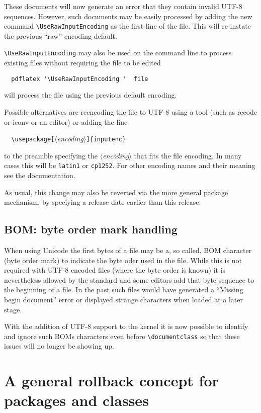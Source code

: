 \documentclass{ltnews}
\providecommand\meta[1]{$\langle$\textit{#1}$\rangle$}
\begin{document}
These documents will now generate an error that they contain invalid
UTF-8 sequences.  However, such documents may be easily processed by
adding the new command \verb|\UseRawInputEncoding| as the first line
of the file. This will re-instate the previous ``raw'' encoding
default.

\verb|\UseRawInputEncoding| may also be used on the command line to
process existing files without requiring the file to be edited
\begin{verbatim}
  pdflatex '\UseRawInputEncoding '  file
\end{verbatim}
will process the file using the previous default encoding.

Possible alternatives are reencoding the file to UTF-8 using a tool
(such as recode or iconv or an editor) or adding the line
\begin{flushleft}
\verb=  \usepackage[=\meta{encoding}\verb=]{inputenc}=
\end{flushleft}
to the preamble specifying the \meta{encoding} that fits the file
encoding.  In many cases this will be \texttt{latin1} or
\texttt{cp1252}. For other encoding names and their meaning see the
 documentation.

As usual, this change may also be reverted via the more general
 package mechanism, by speciying a release date
earlier than this release.


\subsection{BOM: byte order mark handling}

When using Unicode the first bytes of a file may be a, so called, BOM
character (byte order mark) to indicate the byte oder used in the
file. While this is not required with UTF-8 encoded files (where the
byte order is known) it is nevertheless allowed by the standard and
some editors add that byte sequence to the beginning of a file. In the
past such files would have generated a ``Missing begin document''
error or displayed strange characters when loaded at a later stage.

With the addition of UTF-8 support to the kernel it is now possible to
identify and ignore such BOMs characters even before
\verb=\documentclass= so that these issues will no longer be showing
up.



\section[A general rollback concept]
        {A general rollback concept for packages and classes}
\end{document}
